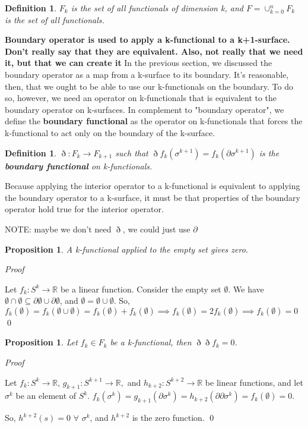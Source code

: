\documentclass{book}
\newtheorem{defn}[equation]{Definition}
\newtheorem{prop}[equation]{Proposition}
\renewenvironment{proof}{\emph{Proof}}{\qed}
\begin{document}
\begin{defn}
	$F_k$ is the set of all functionals of dimension k, and $F = \cup_{k=0}^nF_k$ is the set of all functionals. 
\end{defn}

\textbf{Boundary operator is used to apply a k-functional to a k+1-surface. Don't really say that they are equivalent. Also, not really that we need it, but that we can create it}
In the previous section, we discussed the boundary operator as a map from a k-surface to its boundary. It's reasonable, then, that we ought to be able to use our k-functionals on the boundary. To do so, however, we need an operator on k-functionals that is equivalent to the boundary operator on k-surfaces. In complement to "boundary operator", we define the \textbf{boundary functional} as the operator on k-functionals that forces the k-functional to act only on the boundary of the k-surface. 

\begin{defn}
	$\eth : F_k \to F_{k+1}$ such that $\eth f_k(\sigma^{k+1}) = f_k(\partial \sigma^{k+1})$ is the \textbf{boundary functional} on k-functionals. 
\end{defn}

Because applying the interior operator to a k-functional is equivalent to applying the boundary operator to a k-surface, it must be that properties of the boundary operator hold true for the interior operator. 

NOTE: maybe we don't need $\eth$, we could just use $\partial$

\begin{prop}
	A k-functional applied to the empty set gives zero. 
\end{prop}
\begin{proof}
	
	Let $f_k : S^k \to \mathbb{R}$ be a linear function. Consider the empty set $\emptyset$. 
We have $\emptyset \cap \emptyset \subseteq \partial\emptyset \cup \partial\emptyset$, and $\emptyset = \emptyset\cup\emptyset$. 
So, $f_k(\emptyset) = f_k(\emptyset\cup\emptyset) = f_k(\emptyset) + f_k(\emptyset) \implies f_k(\emptyset) = 2f_k(\emptyset) \implies f_k(\emptyset) = 0$
\end{proof}



\begin{prop}
	Let $f_k \in F_k$ be a k-functional, then $\eth\eth f_k = 0 $.
	
	
\end{prop}
\begin{proof}

	Let $f_k : S^k \to \mathbb{R}$, $g_{k+1} : S^{k+1} \to \mathbb{R},$ and $h_{k+2}: S^{k+2} \to \mathbb{R}$ be linear functions, and let $\sigma^k$ be an element of $S^k$. $f_k(\sigma^k) = g_{k+1}(\partial \sigma^k) = h_{k+2}(\partial\partial \sigma^k) = f_k(\emptyset) = 0$. 
	
	So, $h^{k+2}(s) = 0$ $\forall$ $\sigma^k$, and $h^{k+2}$ is the zero function. 
\end{proof}
\end{document}
